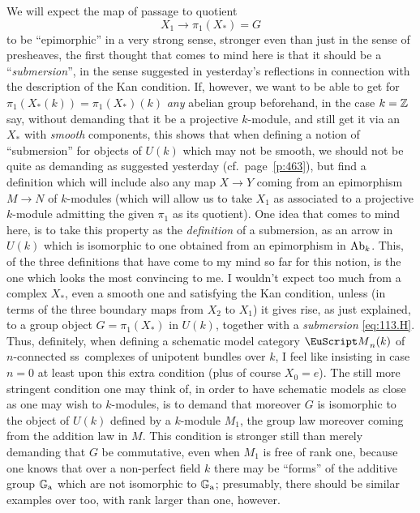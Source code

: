 We will expect the map of passage to quotient
\begin{equation}
  \label{eq:113.H}
  X_1\to \pi_1(X_*)=G\tag{H}
\end{equation}
to be ``epimorphic'' in a very strong sense, stronger even than just
in the sense of presheaves, the first thought that comes to mind here
is that it should be a ``\emph{submersion}'', in the sense suggested in
yesterday's reflections in connection with the description of the Kan
condition. If, however, we want to be able to get for
$\pi_1(X_*(k))=\pi_1(X_*)(k)$ \emph{any} abelian group beforehand, in the case $k={\mathbb{Z}}$
say, without demanding that it be a projective $k$-module, and still
get it via an $X_*$ with \emph{smooth} components, this shows that
when defining a notion of ``submersion'' for objects of $U(k)$ which
may not be smooth, we should not be quite as demanding as suggested
yesterday (cf.\ page~\ref{p:463}), but find a definition which will
include also any map $X\to Y$ coming from an epimorphism $M\to N$ of
$k$-modules (which will allow us to take $X_1$ as associated to a
projective $k$-module admitting the given $\pi_1$ as its
quotient). One idea that comes to mind here, is to take this property
as the \emph{definition} of a submersion, as an arrow in $U(k)$ which
is isomorphic to one obtained from an epimorphism in $\operatorname{Ab}_k$. This,
of the three definitions that have come to my mind so far for this
notion, is the one which looks the most convincing to me. I wouldn't
expect too much from a complex $X_*$, even a smooth one and satisfying
the Kan condition, unless (in terms of the three boundary maps from
$X_2$ to $X_1$) it gives rise, as just explained, to a group object
$G=\pi_1(X_*)$ in $U(k)$, together with a \emph{submersion}
\eqref{eq:113.H}. Thus, definitely, when defining a schematic model
category $\scrM_n(k)$ of $n$-connected ss~complexes of unipotent
bundles over $k$, I feel like insisting in case $n=0$ at least upon
this extra condition (plus of course $X_0=e$). The still more
stringent condition one may think of, in order to have schematic
models as close as one may wish to $k$-modules, is to
demand that moreover $G$ is isomorphic to the object of $U(k)$ defined
by a $k$-module $M_1$, the group law moreover coming from the addition
law in $M$. This condition is stronger still than merely demanding
that $G$ be commutative, even when $M_1$ is free of rank one, because
one knows that over a non-perfect field $k$ there may be ``forms'' of
the additive group ${\mathbb{G}}_{\mathrm{a}}$ which are not isomorphic to ${\mathbb{G}}_{\mathrm{a}}$;
presumably, there should be similar examples over \bZ{} too, with rank
larger than one, however.

